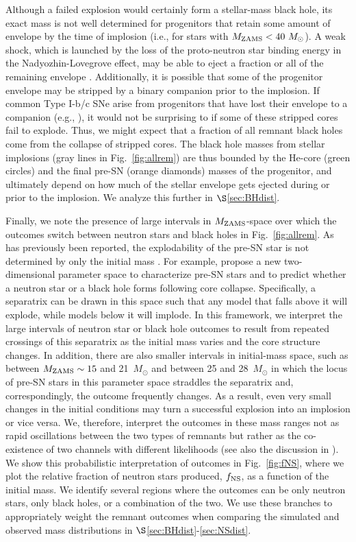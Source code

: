 \documentclass[]{emulateapj}
\newcommand{\Ms}{M_{\odot}}
\newcommand{\Mz}{M_{\rm ZAMS}}
\begin{document}
Although a failed explosion would certainly form a stellar-mass black hole, its exact mass is not well determined for progenitors that retain some amount of envelope by the time of implosion (i.e., for stars with $\Mz < 40~\Ms$). A weak shock, which is launched by the loss of the proto-neutron star binding energy in the Nadyozhin-Lovegrove effect, may be able to eject a fraction or all of the remaining envelope \citep{Nadezhin1980, Lovegrove2013, Coughlin2017, Fernandez2017}. Additionally, it is possible that some of the progenitor envelope may be stripped by a binary companion prior to the implosion. If common Type I-b/c SNe arise from progenitors that have lost their envelope to a companion (e.g., \citealt{Dessart2012, Dessart2015}), it would not be surprising to if some of these stripped cores fail to explode. Thus, we might expect that a fraction of all remnant black holes come from the collapse of stripped cores. The black hole masses from stellar implosions (gray lines in Fig.~\ref{fig:allrem}) are thus bounded by the He-core (green circles) and the final pre-SN (orange diamonds) masses of the progenitor, and ultimately depend on how much of the stellar envelope gets ejected during or prior to the implosion. We analyze this further in $\S$\ref{sec:BHdist}.

Finally, we note the presence of large intervals in $\Mz$-space over which the outcomes switch between neutron stars and black holes in Fig.~\ref{fig:allrem}. As has previously been reported, the explodability of the pre-SN star is not determined by only the initial mass \citep{OConnor2011, Ugliano2012, Pejcha2015, Ertl2016, Sukhbold2016, Muller2016, Murphy2017}. For example, \citet{Ertl2016} propose a new two-dimensional parameter space to characterize pre-SN stars and to predict whether a neutron star or a black hole forms following core collapse. Specifically, a separatrix can be drawn in this space such that any model that falls above it will explode, while models below it will implode. In this framework, we interpret the large intervals of neutron star or black hole outcomes to result from repeated crossings of this separatrix as the initial mass varies and the core structure changes. In addition, there are also smaller intervals in initial-mass space, such as between $\Mz \sim 15$ and 21~$\Ms$ and between 25 and 28~$\Ms$ in which the locus of pre-SN stars in this parameter space straddles the separatrix and, correspondingly, the outcome frequently changes. As a result, even very small changes in the initial conditions may turn a successful explosion into an implosion or vice versa. We, therefore, interpret the outcomes in these mass ranges not as rapid oscillations between the two types of remnants but rather as the co-existence of two channels with different likelihoods (see also the discussion in \citealt{Clausen2015}). We show this probabilistic interpretation of outcomes in Fig.~\ref{fig:fNS}, where we plot the relative fraction of neutron stars produced, $f_{\rm NS}$, as a function of the initial mass. We identify several regions where the outcomes can be only neutron stars,  only black holes, or a combination of the two. We use these branches to appropriately weight the remnant outcomes when comparing the simulated and observed mass distributions in $\S$\ref{sec:BHdist}-\ref{sec:NSdist}.
\end{document}
